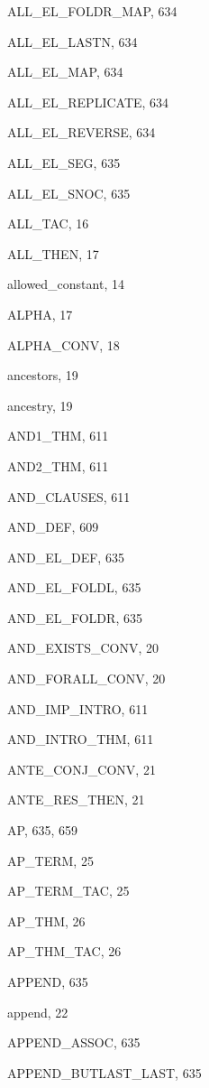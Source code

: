 \begin{theindex}
  \item {\ptt ALL\_EL\_FOLDR\_MAP}, 634
  \item {\ptt ALL\_EL\_LASTN}, 634
  \item {\ptt ALL\_EL\_MAP}, 634
  \item {\ptt ALL\_EL\_REPLICATE}, 634
  \item {\ptt ALL\_EL\_REVERSE}, 634
  \item {\ptt ALL\_EL\_SEG}, 635
  \item {\ptt ALL\_EL\_SNOC}, 635
  \item {\ptt ALL\_TAC}, 16
  \item {\ptt ALL\_THEN}, 17
  \item {\ptt allowed\_constant}, 14
  \item {\ptt ALPHA}, 17
  \item {\ptt ALPHA\_CONV}, 18
  \item {\ptt ancestors}, 19
  \item {\ptt ancestry}, 19
  \item {\ptt AND1\_THM}, 611
  \item {\ptt AND2\_THM}, 611
  \item {\ptt AND\_CLAUSES}, 611
  \item {\ptt AND\_DEF}, 609
  \item {\ptt AND\_EL\_DEF}, 635
  \item {\ptt AND\_EL\_FOLDL}, 635
  \item {\ptt AND\_EL\_FOLDR}, 635
  \item {\ptt AND\_EXISTS\_CONV}, 20
  \item {\ptt AND\_FORALL\_CONV}, 20
  \item {\ptt AND\_IMP\_INTRO}, 611
  \item {\ptt AND\_INTRO\_THM}, 611
  \item {\ptt ANTE\_CONJ\_CONV}, 21
  \item {\ptt ANTE\_RES\_THEN}, 21
  \item {\ptt AP}, 635, 659
  \item {\ptt AP\_TERM}, 25
  \item {\ptt AP\_TERM\_TAC}, 25
  \item {\ptt AP\_THM}, 26
  \item {\ptt AP\_THM\_TAC}, 26
  \item {\ptt APPEND}, 635
  \item {\ptt append}, 22
  \item {\ptt APPEND\_ASSOC}, 635
  \item {\ptt APPEND\_BUTLAST\_LAST}, 635

\end{theindex}
